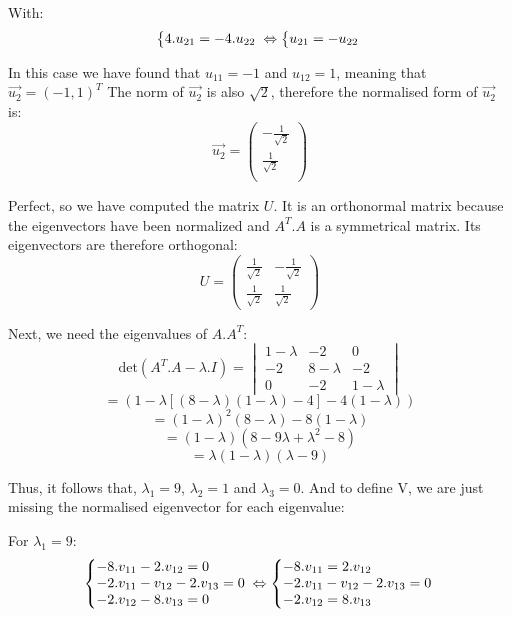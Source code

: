 \documentclass[a4,12pt,twosided,openany]{memoir}
\begin{document}
\par 
\indent
With:
\[  \left\{\begin{array}{@{}l@{}}
   4.u_{21} = -4.u_{22}\\
  \end{array}\right.\,
   \Leftrightarrow
  \left\{\begin{array}{@{}l@{}}
   u_{21} = -u_{22}
  \end{array}\right.\,
\]
\par 
\indent
In this case we have found that $u_{11} = -1$ and $u_{12} = 1$, meaning that $\overrightarrow{u_2} = (-1,1)^T$
The norm of $\overrightarrow{u_2}$ is also $\sqrt{2}$, therefore the normalised form of $\overrightarrow{u_2}$ is:
\[
\overrightarrow{u_2} = \begin{pmatrix}
-\frac{1}{\sqrt{2}}\\
\frac{1}{\sqrt{2}}\\
\end{pmatrix}
\]
\par 
\indent
Perfect, so we have computed the matrix $U$. It is an orthonormal matrix because the eigenvectors have been normalized and $A^T.A$ is a symmetrical matrix. Its eigenvectors are therefore orthogonal:
\[
U = \begin{pmatrix}
\frac{1}{\sqrt{2}} & -\frac{1}{\sqrt{2}} \\
\frac{1}{\sqrt{2}} & \frac{1}{\sqrt{2}}
\end{pmatrix}
\]
\par 
\indent
Next, we need the eigenvalues of $A.A^T$:
\[
\textrm{det}(A^T.A - \lambda.I) = \begin{vmatrix} 
1-\lambda & -2 & 0 \\
-2 & 8-\lambda & -2 \\
0 & -2 & 1-\lambda
\end{vmatrix}
\]
\[=(1-\lambda\left[(8-\lambda)(1-\lambda)-4 \right]-4(1-\lambda) )\]
\[=(1-\lambda)^2(8-\lambda)-8(1-\lambda)\]
\[=(1-\lambda)(8-9\lambda + \lambda^2 -8)\]
\[=\lambda(1-\lambda)(\lambda-9)\]
\par 
\indent
Thus, it follows that, $\lambda_1 = 9$, $\lambda_2 = 1$ and $\lambda_3 = 0$. And to define V, we are just missing the normalised eigenvector for each eigenvalue:
\par 
\indent
For $\lambda_1 = 9$:
\[
  \left\{\begin{array}{@{}l@{}}
   -8.v_{11} -2.v_{12} = 0\\
   -2.v_{11} -v_{12}-2.v_{13} = 0\\
   -2.v_{12}- 8.v_{13} = 0\\
  \end{array}\right.\,
   \Leftrightarrow
  \left\{\begin{array}{@{}l@{}}
  -8.v_{11} = 2.v_{12}\\
  -2.v_{11} -v_{12}-2.v_{13} = 0\\
  -2.v_{12} = 8.v_{13}\\
  \end{array}\right.\,
\]
\end{document}
